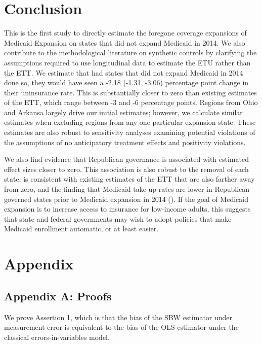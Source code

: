 \documentclass[12pt]{article}
\begin{document}
\section{Conclusion}

This is the first study to directly estimate the foregone coverage expansions of Medicaid Expansion on states that did not expand Medicaid in 2014. We also contribute to the methodological literature on synthetic controls by clarifying the assumptions required to use longitudinal data to estimate the ETU rather than the ETT. We estimate that had states that did not expand Medicaid in 2014 done so, they would have seen a -2.18 (-1.31, -3.06) percentage point change in their uninsurance rate. This is substantially closer to zero than existing estimates of the ETT, which range between -3 and -6 percentage points. Regions from Ohio and Arkansa largely drive our initial estimates; however, we calculate similar estimates when excluding regions from any one particular expansion state. These estimates are also robust to sensitivity analyses examining potential violations of the assumptions of no anticipatory treatment effects and positivity violations. 

We also find evidence that Republican governance is associated with estimated effect sizes closer to zero. This association is also robust to the removal of each state, is consistent with existing estimates of the ETT that are also farther away from zero, and the finding that Medicaid take-up rates are lower in Republican-governed states prior to Medicaid expansion in 2014 (\cite{sommers2012understanding}). If the goal of Medicaid expansion is to increase access to insurance for low-income adults, this suggests that state and federal governments may wish to adopt policies that make Medicaid enrollment automatic, or at least easier.

\cleardoublepage
 

\cleardoublepage

\section{Appendix}

\subsection{Appendix A: Proofs}

We prove Assertion 1, which is that the bias of the SBW estimator under measurement error is equivalent to the bias of the OLS estimator under the classical errors-in-variables model. 
\end{document}
